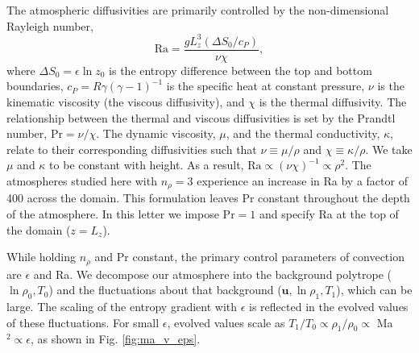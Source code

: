 \documentclass[aps, prl, twocolumn, nofootinbib, groupedaddress, amsfonts, amssymb, amsmath]{revtex4-1}
\begin{document}
The atmospheric diffusivities are primarily controlled by
the non-dimensional Rayleigh number,
\begin{equation}
\text{Ra} = \frac{g L_z^3 (\Delta S_0 / c_P)}{\nu\chi},
\end{equation}
where $\Delta S_0 = \epsilon\ln z_0$ is the entropy difference 
between the top and bottom boundaries, 
$c_P = R\gamma(\gamma-1)^{-1}$ is the specific heat 
at constant pressure, $\nu$ is the kinematic viscosity 
(the viscous diffusivity), and $\chi$ is the thermal diffusivity.  
The relationship between the thermal and viscous diffusivities is
set by the Prandtl number, $\text{Pr} = \nu/\chi$.   
The dynamic viscosity, $\mu$, and the thermal conductivity,
$\kappa$, relate to their corresponding diffusivities such that 
$\nu \equiv \mu/\rho$ and $\chi \equiv \kappa/\rho$.  We take
$\mu$ and $\kappa$ to be constant with height.
As a result, $\text{Ra} \propto (\nu\chi)^{-1} \propto
\rho^2$.  The atmospheres studied here with $n_{\rho} = 3$ 
experience an increase in Ra 
by a factor of 400 across the domain.  This formulation leaves Pr
constant throughout the depth of the atmosphere. 
In this letter we impose $\text{Pr} = 1$ and specify Ra at 
the top of the domain ($z = L_z$). 

While holding $n_\rho$ and Pr constant, 
the primary control parameters of convection are $\epsilon$
and Ra.  We decompose our atmosphere into the background 
polytrope ($\ln\rho_{0}, T_{0}$) and the fluctuations
about that background ($\bm{u}, \ln\rho_{1}, T_{1}$),
which can be large.
The scaling of the entropy gradient with $\epsilon$
is reflected in the evolved values of these fluctuations.  For small $\epsilon$,
evolved values scale as
$T_1/T_0 \propto \rho_{1}/\rho_{0} \propto$ Ma$^{2} \propto \epsilon$,
as shown in Fig. \ref{fig:ma_v_eps}.  
\end{document}
